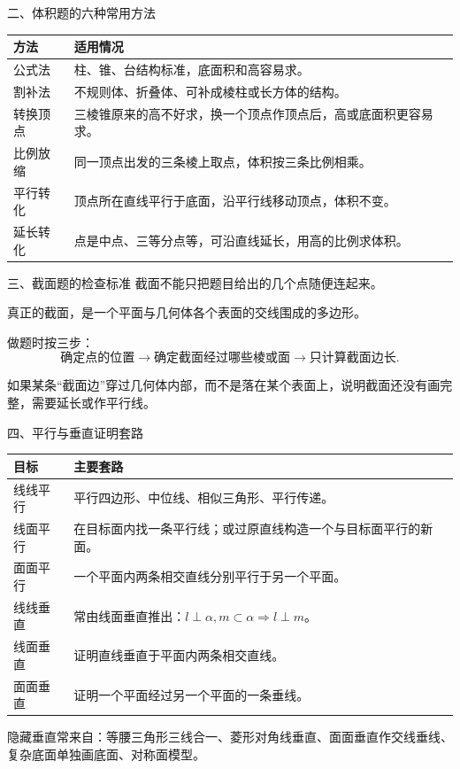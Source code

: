 \documentclass[11pt,a4paper]{ctexart}
\begin{document}
\begin{modelbox}{二、体积题的六种常用方法}
\renewcommand{\arraystretch}{1.35}
\begin{tabularx}{\textwidth}{p{3.0cm}X}
\toprule
方法 & 适用情况 \\
\midrule
公式法 & 柱、锥、台结构标准，底面积和高容易求。\\ \hline
割补法 & 不规则体、折叠体、可补成棱柱或长方体的结构。\\ \hline
转换顶点 & 三棱锥原来的高不好求，换一个顶点作顶点后，高或底面积更容易求。\\ \hline
比例放缩 & 同一顶点出发的三条棱上取点，体积按三条比例相乘。\\ \hline
平行转化 & 顶点所在直线平行于底面，沿平行线移动顶点，体积不变。\\ \hline
延长转化 & 点是中点、三等分点等，可沿直线延长，用高的比例求体积。\\
\bottomrule
\end{tabularx}
\end{modelbox}

\begin{modelbox}{三、截面题的检查标准}
截面不能只把题目给出的几个点随便连起来。

真正的截面，是一个平面与几何体各个表面的交线围成的多边形。

做题时按三步：
\[
  \boxed{\text{确定点的位置}}
  \rightarrow
  \boxed{\text{确定截面经过哪些棱或面}}
  \rightarrow
  \boxed{\text{只计算截面边长}}.
\]

如果某条“截面边”穿过几何体内部，而不是落在某个表面上，说明截面还没有画完整，需要延长或作平行线。
\end{modelbox}

\begin{modelbox}{四、平行与垂直证明套路}
\renewcommand{\arraystretch}{1.35}
\begin{tabularx}{\textwidth}{p{3.2cm}X}
\toprule
目标 & 主要套路 \\
\midrule
线线平行 & 平行四边形、中位线、相似三角形、平行传递。\\ \hline
线面平行 & 在目标面内找一条平行线；或过原直线构造一个与目标面平行的新面。\\ \hline
面面平行 & 一个平面内两条相交直线分别平行于另一个平面。\\ \hline
线线垂直 & 常由线面垂直推出：\(l\perp\alpha,m\subset\alpha\Rightarrow l\perp m\)。\\ \hline
线面垂直 & 证明直线垂直于平面内两条相交直线。\\ \hline
面面垂直 & 证明一个平面经过另一个平面的一条垂线。\\
\bottomrule
\end{tabularx}

隐藏垂直常来自：等腰三角形三线合一、菱形对角线垂直、面面垂直作交线垂线、复杂底面单独画底面、对称面模型。
\end{modelbox}
\end{document}
